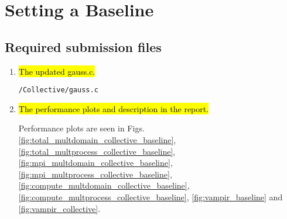 
\section{Setting a Baseline}
\subsection{Required submission files}
\begin{enumerate}
	\item \hl{The updated gauss.c.}
	
	\verb!/Collective/gauss.c!

	\item \hl{The performance plots and description in the report.}
		
	Performance plots are seen in Figs. \ref{fig:total_multdomain_collective_baseline}, \ref{fig:total_multprocess_collective_baseline}, \ref{fig:mpi_multdomain_collective_baseline},
	\ref{fig:mpi_multprocess_collective_baseline}, \ref{fig:compute_multdomain_collective_baseline},
	\ref{fig:compute_multprocess_collective_baseline}, \ref{fig:vampir_baseline} and \ref{fig:vampir_collective}.

\end{enumerate}

